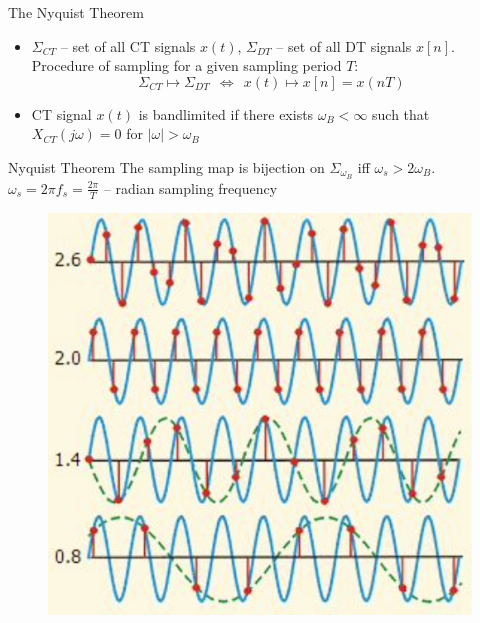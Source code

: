 \begin{frame}{The Nyquist Theorem}
	\begin{itemize}
		\item $\Sigma_{C T}$ -- set of all CT signals $x(t)$, $\Sigma_{D T}$ -- set of all DT signals $x[n]$. Procedure of sampling for a given sampling period $T$:
		$$
		\Sigma_{C T} \longmapsto \Sigma_{D T} ~~\Leftrightarrow ~~x(t) \longmapsto x[n]=x(n T)
		$$
		\item CT signal $x(t)$ is bandlimited if there exists $\omega_B<\infty$ such that $X_{C T}(j \omega)=0$ for $|\omega|>\omega_B$
	\end{itemize}
	
	\begin{block}{Nyquist Theorem}
		The sampling map is bijection on $\Sigma_{\omega_B}$ iff $\omega_s>2 \omega_B$. $\omega_s=2 \pi f_s=\frac{2 \pi}{T}$ -- radian sampling frequency
	\end{block}
\begin{figure}
	\centering
	\includegraphics[width=0.38\linewidth]{figs/nyquist.png}
\end{figure}
\end{frame}

